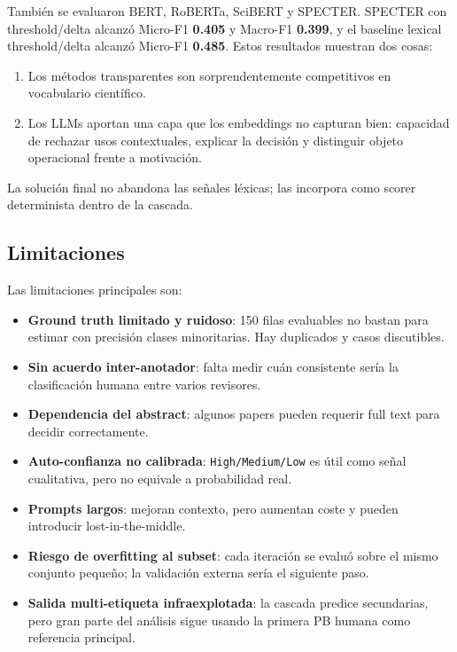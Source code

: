 También se evaluaron BERT, RoBERTa, SciBERT y SPECTER. SPECTER con threshold/delta alcanzó Micro-F1 \textbf{0.405} y Macro-F1 \textbf{0.399}, y el baseline lexical threshold/delta alcanzó Micro-F1 \textbf{0.485}. Estos resultados muestran dos cosas:

\begin{enumerate}
\item Los métodos transparentes son sorprendentemente competitivos en vocabulario científico.
\item Los LLMs aportan una capa que los embeddings no capturan bien: capacidad de rechazar usos contextuales, explicar la decisión y distinguir objeto operacional frente a motivación.
\end{enumerate}

La solución final no abandona las señales léxicas; las incorpora como scorer determinista dentro de la cascada.

\subsection{Limitaciones}

Las limitaciones principales son:

\begin{itemize}
\item \textbf{Ground truth limitado y ruidoso}: 150 filas evaluables no bastan para estimar con precisión clases minoritarias. Hay duplicados y casos discutibles.
\item \textbf{Sin acuerdo inter-anotador}: falta medir cuán consistente sería la clasificación humana entre varios revisores.
\item \textbf{Dependencia del abstract}: algunos papers pueden requerir full text para decidir correctamente.
\item \textbf{Auto-confianza no calibrada}: \texttt{High/Medium/Low} es útil como señal cualitativa, pero no equivale a probabilidad real.
\item \textbf{Prompts largos}: mejoran contexto, pero aumentan coste y pueden introducir lost-in-the-middle.
\item \textbf{Riesgo de overfitting al subset}: cada iteración se evaluó sobre el mismo conjunto pequeño; la validación externa sería el siguiente paso.
\item \textbf{Salida multi-etiqueta infraexplotada}: la cascada predice secundarias, pero gran parte del análisis sigue usando la primera PB humana como referencia principal.
\end{itemize}

